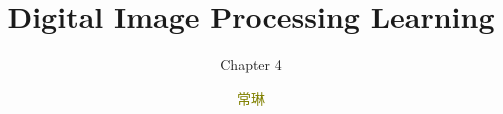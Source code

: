 \documentclass[notheorems, serif, table, compress]{beamer}  %
\begin{document}
\title{Digital Image Processing Learning}
\subtitle{Chapter 4}
\author[]{\textcolor{olive}{常琳}}
\frame{ \titlepage }
\def\hilite<#1>{\temporal<#1>{\color{blue!15}}{\color{black}}{\color{black}}}
\newcommand{\shadow}[2][purple]{\hskip5pt\shadowbox{\color{#1}\small \kai #2\vspace{3mm}}}
\newcommand{\colorrbox}[2][purple]{\doublebox{\color{#1}\small \kai#2}}

\end{document}
